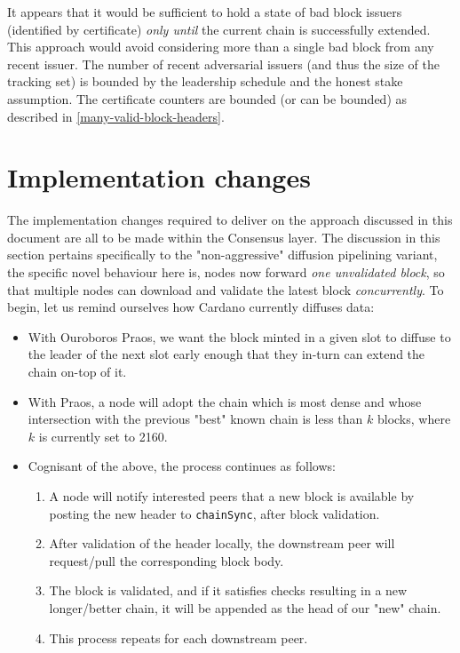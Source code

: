 \documentclass[11pt,a4paper]{article}
\begin{document}
It appears that it would be sufficient to hold a state of bad block issuers
(identified by certificate) \emph{only until} the current chain is successfully
extended. This approach would avoid considering more than a single bad block from any
recent issuer. The number of recent adversarial issuers (and thus the size of
the tracking set) is bounded by the leadership schedule and the honest stake
assumption. The certificate counters are bounded (or can be bounded) as
described in \cref{many-valid-block-headers}.

\pagebreak

\section{Implementation changes}
The implementation changes required to deliver on the approach discussed in this document
are all to be made within the Consensus layer. The discussion in this section pertains specifically 
to the "non-aggressive" diffusion pipelining variant, the specific novel behaviour here is, nodes now
forward \emph{one unvalidated block}, so that multiple nodes can download and validate the latest 
block \emph{concurrently}. To begin, let us remind ourselves how Cardano currently diffuses data:

\begin{itemize}
  \item With Ouroboros Praos, we want the block minted in a given slot to diffuse to the leader of the next slot early enough that they in-turn can extend the chain on-top of it.
  \item With Praos, a node will adopt the chain which is most dense and whose intersection with the previous "best" known chain is less than $k$ blocks, where $k$ is currently set to 2160.
  \item Cognisant of the above, the process continues as follows:
  \begin{enumerate}
    \item A node will notify interested peers that a new block is available by posting the new header to \lstinline{chainSync}, after block validation. 
    \item After validation of the header locally, the downstream peer will request/pull the corresponding block body.
    \item The block is validated, and if it satisfies checks resulting in a new longer/better chain, it will be appended as the head of our "new" chain.
    \item This process repeats for each downstream peer.
  \end{enumerate}
\end{itemize}
\end{document}
